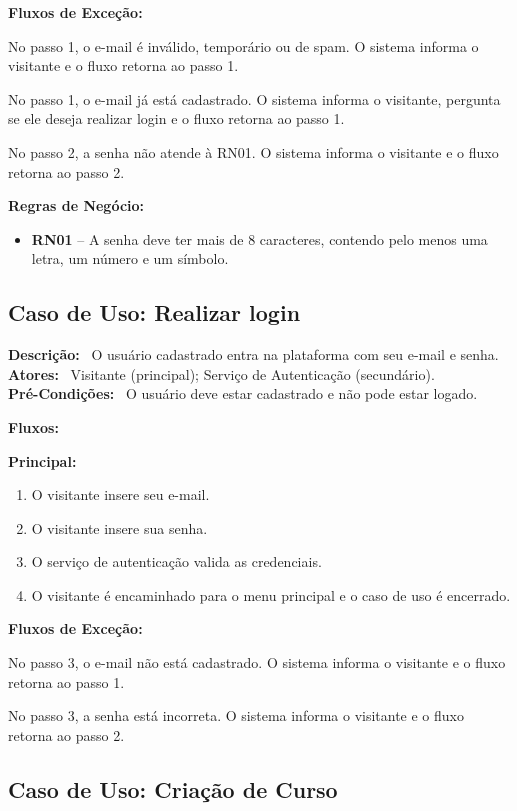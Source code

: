 \documentclass[11pt,a4paper]{article}
\newcommand{\casodeuso}[1]{\subsection{Caso de Uso: #1}}
\newcommand{\campo}[1]{\textbf{#1:}~}
\newcommand{\fluxotitulo}[1]{\par\needspace{8\baselineskip}\medskip\hspace*{1.5em}\textbf{#1}\par\nopagebreak}
\newenvironment{principal}
  {\begin{enumerate}[leftmargin=4.5em,itemsep=0pt,topsep=2pt]}
  {\end{enumerate}}
\newenvironment{passos}
  {\begin{description}[leftmargin=4.5em,labelindent=3em,itemsep=0pt,topsep=2pt,
     font=\normalfont\bfseries,style=sameline]}
  {\end{description}}
\newcommand{\passo}[1]{\item[#1 -]}
\newenvironment{itens}
  {\begin{itemize}[leftmargin=3em,itemsep=0pt,topsep=2pt]}
  {\end{itemize}}
\begin{document}
  \fluxotitulo{Fluxos de Exceção:}
  \begin{passos}
    \passo{E1} No passo 1, o e-mail é inválido, temporário ou de spam. O
    sistema informa o visitante e o fluxo retorna ao passo 1.
    \passo{E2} No passo 1, o e-mail já está cadastrado. O sistema informa o
    visitante, pergunta se ele deseja realizar login e o fluxo retorna ao
    passo 1.
    \passo{E3} No passo 2, a senha não atende à RN01. O sistema informa o
    visitante e o fluxo retorna ao passo 2.
  \end{passos}

  \campo{Regras de Negócio}
  \begin{itens}
    \item \textbf{RN01} -- A senha deve ter mais de 8 caracteres, contendo pelo
    menos uma letra, um número e um símbolo.
  \end{itens}

  \casodeuso{Realizar login}

  \campo{Descrição} O usuário cadastrado entra na plataforma com seu e-mail e
  senha.\\
  \campo{Atores} Visitante (principal); Serviço de Autenticação (secundário).\\
  \campo{Pré-Condições} O usuário deve estar cadastrado e não pode estar logado.

  \campo{Fluxos}

  \fluxotitulo{Principal:}
  \begin{principal}
    \item O visitante insere seu e-mail.
    \item O visitante insere sua senha.
    \item O serviço de autenticação valida as credenciais.
    \item O visitante é encaminhado para o menu principal e o caso de uso é
    encerrado.
  \end{principal}

  \fluxotitulo{Fluxos de Exceção:}
  \begin{passos}
    \passo{E1} No passo 3, o e-mail não está cadastrado. O sistema informa o
    visitante e o fluxo retorna ao passo 1.
    \passo{E2} No passo 3, a senha está incorreta. O sistema informa o
    visitante e o fluxo retorna ao passo 2.
  \end{passos}

  \casodeuso{Criação de Curso}
\end{document}
